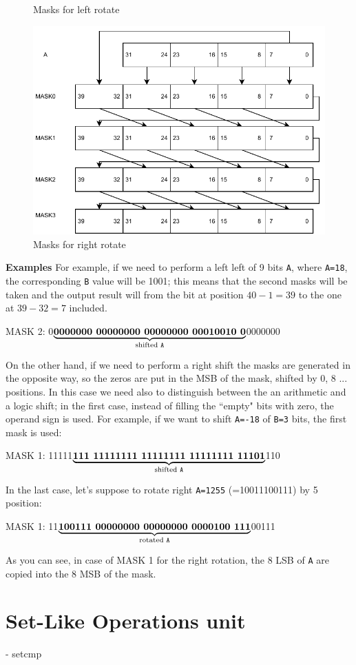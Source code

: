 \begin{figure}[H]
\begin{minipage}[b]{0.5\linewidth}
		\caption{Masks for left rotate} 
		\vspace{4ex}
	\end{minipage}%
	\begin{minipage}[b]{0.5\linewidth}
		\centering
		\includegraphics[width=.78\linewidth]{chapters/5_ExecuteStage/images/right_rotate.pdf} 
		\caption{Masks for right rotate} 
		\vspace{4ex}
	\end{minipage} 
\end{figure}
\begin{mybox}
	\textbf{Examples}
	\newline
	For example, if we need to perform a left left of 9 bits \texttt{A}, where \texttt{A=18}, the corresponding \texttt{B} value will be 1001; this means that the second masks will be taken and the output result will from the bit at position $40-1=39$ to the one at $39-32=7$ included.
	\begin{center}
		MASK 2: 0$\underbrace{\textbf{0000000 00000000 00000000 00010010 0}}_{\text{shifted \texttt{A}}}$0000000
	\end{center}
	
	On the other hand, if we need to perform a right shift the masks are generated in the opposite way, so the zeros are put in the MSB of the mask, shifted by 0, 8 ... positions. In this case we need also to distinguish between the an arithmetic and a logic shift; in the first case, instead of filling the ``empty" bits with zero, the operand sign is used. For example, if we want to shift \texttt{A=-18} of \texttt{B=3} bits, the first mask is used: 
	\begin{center}
		MASK 1: 11111$\underbrace{\textbf{111 11111111 11111111 11111111 11101}}_{\text{shifted \texttt{A}}}$110
	\end{center}
	
	In the last case, let's suppose to rotate right \texttt{A=1255} (=10011100111) by 5 position:
	\begin{center}
		MASK 1: 11$\underbrace{\textbf{100111 00000000 00000000 0000100 111}}_{\text{rotated \texttt{A}}}$00111
	\end{center}
	As you can see, in case of MASK 1 for the right rotation, the 8 LSB of \texttt{A} are copied into the 8 MSB of the mask.
\end{mybox}
	

\section{Set-Like Operations unit}
- setcmp
